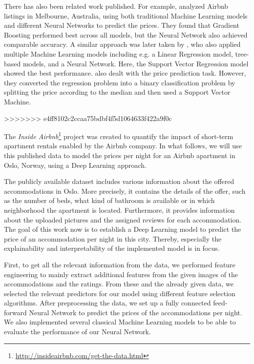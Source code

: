 There has also been related work published. For example, \citet{cai2019} analyzed Airbnb listings in Melbourne, Australia, using both traditional Machine Learning models and different Neural Networks to predict the prices. They found that Gradient Boosting performed best across all models, but the Neural Network also achieved comparable accuracy.
A similar approach was later taken by \citet{rezazadeh2021}, who also applied multiple Machine Learning models including e.g. a Linear Regression model, tree-based models, and a Neural Network. Here, the Support Vector Regression model showed the best performance.
\citet{tang2015} also dealt with the price prediction task. However, they converted the regression problem into a binary classification problem by splitting the price according to the median and then used a Support Vector Machine.



















>>>>>>> e4ff8102c2ccaa75bdbf4f5d1064633f422a9f0c

The \emph{Inside Airbnb}\footnote{\url{http://insideairbnb.com/get-the-data.html}} project \citep{cox2022} was created to quantify the impact of short-term apartment rentals enabled by the Airbnb company.
In what follows, we will use this published data to model the prices per night for an Airbnb apartment in Oslo, Norway, using a Deep Learning approach.

The publicly available dataset includes various information about the offered accommodations in Oslo.
More precisely, it contains the details of the offer, such as the number of beds, what kind of bathroom is available or in which neighborhood the apartment is located.
Furthermore, it provides information about the uploaded pictures and the assigned reviews for each accommodation.
The goal of this work now is to establish a Deep Learning model to predict the price of an accommodation per night in this city.
Thereby, especially the explainability and interpretability of the implemented model is in focus.

First, to get all the relevant information from the data, we performed feature engineering to mainly extract additional features from the given images of the accommodations and the ratings.
From these and the already given data, we selected the relevant predictors for our model using different feature selection algorithms.
After preprocessing the data, we set up a fully connected feed-forward Neural Network to predict the prices of the accommodations per night.
We also implemented several classical Machine Learning models to be able to evaluate the performance of our Neural Network.

